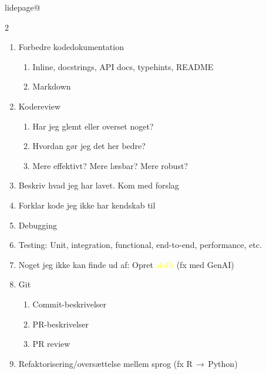 \documentclass[aspectratio=1610,10pt]{beamer}
\makeatletter
\newcounter{slideidx}
\newcommand{\slidetarget}{%
  \stepcounter{slideidx}%
  \hypertarget{slide\theslideidx}{}%
  \expandafter\xdef\csname slidepage@\theslideidx\endcsname{\thepage}%
}
\makeatother
\begin{document}
\begin{frame}{\insertsection}
    \slidetarget
    \begin{multicols}{2}
      \begin{enumerate}[label=\textcolor{accent}{\arabic*.}]
        \item Forbedre kodedokumentation
          \begin{enumerate}[label=\textcolor{accentLight}{\alph*.}]
            \item Inline, docstrings, API docs, typehints, README
            \item Markdown
          \end{enumerate}
        \item Kodereview
          \begin{enumerate}[label=\textcolor{accentLight}{\alph*.}]
            \item Har jeg glemt eller overset noget?
            \item Hvordan gør jeg det her bedre?
            \item Mere effektivt? Mere læsbar? Mere robust?
          \end{enumerate}
        \item Beskriv hvad jeg har lavet. Kom med forslag
        \item Forklar kode jeg ikke har kendskab til
        \item Debugging
        \item \textcolor{accentLight}{Testing}: Unit, integration, functional, end-to-end, performance, etc.
        \item Noget jeg ikke kan finde ud af: Opret \textcolor{yellow}{\emph{skills}} (fx med GenAI)
        \item \textcolor{dimmed}{Git}
          \begin{enumerate}[label=\textcolor{accentLight}{\alph*.}]
            \item \textcolor{dimmed}{Commit-beskrivelser}
            \item \textcolor{dimmed}{PR-beskrivelser}
            \item \textcolor{dimmed}{PR review}
          \end{enumerate}
        \item \textcolor{dimmed}{Refaktorisering/oversættelse mellem sprog (fx R$\,\rightarrow\,$Python)}
      \end{enumerate}
    \end{multicols}
\end{frame}
\end{document}
